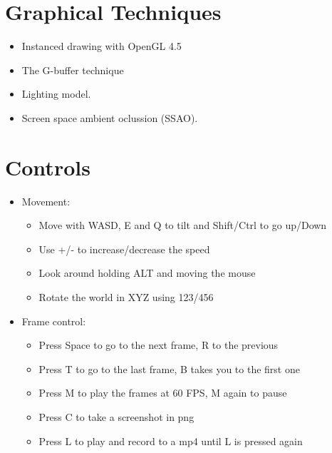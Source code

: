 \documentclass[ twoside,openright,titlepage,numbers=noenddot,%
headinclude,footinclude,cleardoublepage=empty,abstract=on,
BCOR=5mm,paper=a4,fontsize=11pt, dvipsnames
]{scrreprt}
\begin{document}
\section{Graphical Techniques}

\begin{itemize}
\item Instanced drawing with OpenGL 4.5
\item The G-buffer technique
\item Lighting model.
\item Screen space ambient oclussion (SSAO).
\end{itemize}

\section{Controls}

\begin{itemize}
\item  Movement:
  \begin{itemize}
  \item Move with WASD, E and Q to tilt and Shift/Ctrl to go up/Down
  \item Use +/- to increase/decrease the speed
  \item Look around holding ALT and moving the mouse
  \item Rotate the world in XYZ using 123/456    
  \end{itemize}
\item Frame control:
  \begin{itemize}
  \item Press Space to go to the next frame, R to the previous
  \item Press T to go to the last frame, B takes you to the first one
  \item Press M to play the frames at 60 FPS, M again to pause
  \item Press C to take a screenshot in png
  \item Press L to play and record to a mp4 until L is pressed again
  \end{itemize}
\end{itemize}
\end{document}
